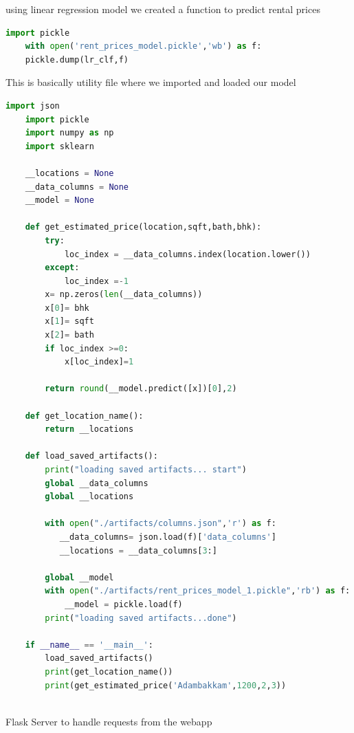 using linear regression model we created a function to predict rental prices
\begin{lstlisting}[language=python]
    import pickle
    with open('rent_prices_model.pickle','wb') as f:
    pickle.dump(lr_clf,f)
\end{lstlisting}

\medskip
\noindent
This is basically utility file where we imported and loaded our model

\begin{lstlisting}[language=python]
    import json
    import pickle
    import numpy as np
    import sklearn
     
    __locations = None
    __data_columns = None
    __model = None
     
    def get_estimated_price(location,sqft,bath,bhk):
        try:
            loc_index = __data_columns.index(location.lower())
        except:
            loc_index =-1
        x= np.zeros(len(__data_columns))
        x[0]= bhk
        x[1]= sqft
        x[2]= bath
        if loc_index >=0:
            x[loc_index]=1
     
        return round(__model.predict([x])[0],2)
     
    def get_location_name():
        return __locations
     
    def load_saved_artifacts():
        print("loading saved artifacts... start")
        global __data_columns
        global __locations
     
        with open("./artifacts/columns.json",'r') as f:
           __data_columns= json.load(f)['data_columns']
           __locations = __data_columns[3:]
     
        global __model
        with open("./artifacts/rent_prices_model_1.pickle",'rb') as f:
            __model = pickle.load(f)
        print("loading saved artifacts...done")
     
    if __name__ == '__main__':
        load_saved_artifacts()
        print(get_location_name())
        print(get_estimated_price('Adambakkam',1200,2,3))
     
\end{lstlisting}

Flask Server to handle requests from the webapp

